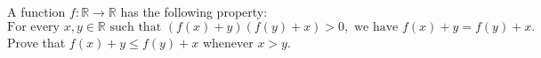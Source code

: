 A function 
$f:\mathbb{R} \to \mathbb{R}$
 has the following property:
$$\text{For every } x,y \in \mathbb{R} \text{ such that }(f(x)+y)(f(y)+x)  > 0, \text{ we have } f(x)+y = f(y)+x.$$
Prove that 
$f(x)+y \leq f(y)+x$
 whenever 
$x >y$.